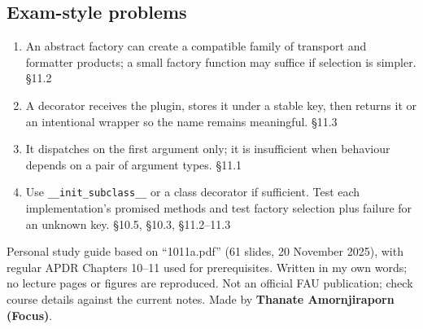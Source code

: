 \documentclass[11pt]{article}
\begin{document}
\begin{keepsection}\subsection{Exam-style problems}

\begin{enumerate}
\item An abstract factory can create a compatible family of transport and formatter products; a small factory function may suffice if selection is simpler. \hfill{\small\color{FAUblue}§11.2}
\item A decorator receives the plugin, stores it under a stable key, then returns it or an intentional wrapper so the name remains meaningful. \hfill{\small\color{FAUblue}§11.3}
\item It dispatches on the first argument only; it is insufficient when behaviour depends on a pair of argument types. \hfill{\small\color{FAUblue}§11.1}
\item Use \texttt{\_\_init\_subclass\_\_} or a class decorator if sufficient. Test each implementation’s promised methods and test factory selection plus failure for an unknown key. \hfill{\small\color{FAUblue}§10.5, §10.3, §11.2–11.3}
\end{enumerate}

\end{keepsection}

\vfill{\small Personal study guide based on “1011a.pdf” (61 slides, 20 November 2025), with regular APDR Chapters 10–11 used for prerequisites. Written in my own words; no lecture pages or figures are reproduced. Not an official FAU publication; check course details against the current notes. Made by \textbf{Thanate Amornjiraporn (Focus)}.}
\end{document}
